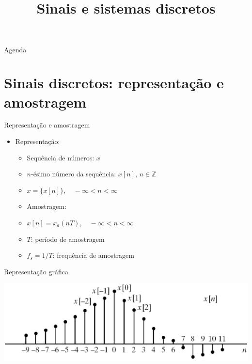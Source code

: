


\title{\cursogrande\\ \vspace{1cm}Sinais e sistemas discretos}



   \maketitle[randomdots={false}]
   \begin{slide}{Agenda}
      \tableofcontents[content=sections]
   \end{slide}

\section[slide=true]{Sinais discretos: representação e amostragem}
   \begin{slide}[toc=]{Representação e amostragem}
      \begin{itemize}
         \item Representação:
         \begin{itemize}
            \item Sequência de números: $x$
            \item $n$-ésimo número da sequência: $x[n]$, $n \in \mathbb{Z}$
            \item $x=\{x[n]\},\quad -\infty < n < \infty$
         \end{itemize}
         \begin{itemize}
         \item Amostragem:
            \item $x[n]=x_a(nT), \quad -\infty < n < \infty$
            \item $T$: período de amostragem
            \item $f_s=1/T$: frequência de amostragem
         \end{itemize}
      \end{itemize}
   \end{slide}

\begin{slide}[toc=]{Representação gráfica}
   \begin{center}
     \includegraphics[width=\textwidth]{figs/2_1.eps}
   \end{center}
\end{slide}

